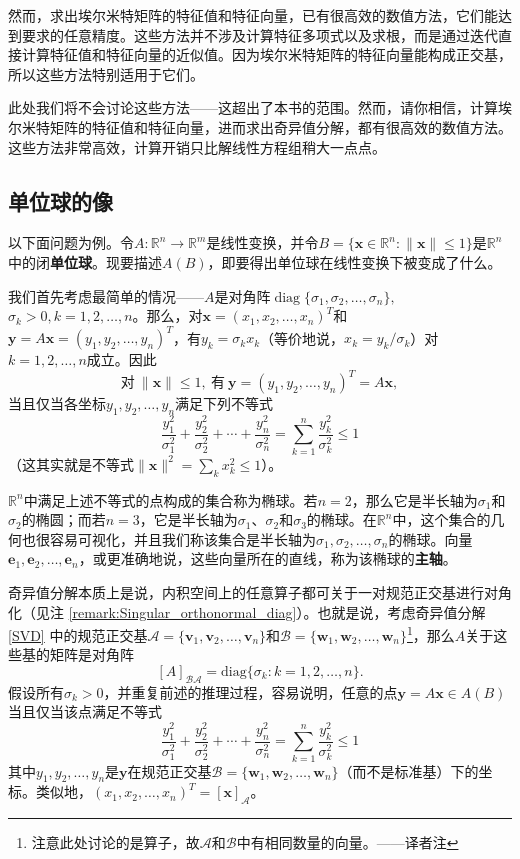 然而，求出埃尔米特矩阵的特征值和特征向量，已有很高效的数值方法，它们能达到要求的任意精度。这些方法并不涉及计算特征多项式以及求根，而是通过迭代直接计算特征值和特征向量的近似值。因为埃尔米特矩阵的特征向量能构成正交基，所以这些方法特别适用于它们。

此处我们将不会讨论这些方法——这超出了本书的范围。然而，请你相信，计算埃尔米特矩阵的特征值和特征向量，进而求出奇异值分解，都有很高效的数值方法。这些方法非常高效，计算开销只比解线性方程组稍大一点点。

\subsection{单位球的像}

以下面问题为例。令$A:\mathbb{R}^n\to \mathbb{R}^m$是线性变换，并令$B=\{\mathbf{x}\in\mathbb{R}^n:\|\mathbf{x}\|\le 1\}$是$\mathbb{R}^n$中的闭{\bf 单位球}。现要描述$A(B)$，即要得出单位球在线性变换下被变成了什么。

我们首先考虑最简单的情况——$A$是对角阵$\operatorname{diag}\{\sigma_1,\sigma_2,\dots,\sigma_n\},$ $\sigma_k>0,k=1,2,\dots,n$。那么，对$\mathbf{x}=(x_{1},x_{2},\ldots,x_{n})^{T}$和$\mathbf{y}=A\mathbf{x}=(y_{1},y_{2},\ldots,y_{n})^{T}$，有$y_k=\sigma_k x_k$（等价地说，$x_k=y_k/\sigma_k$）对$k=1,2,\dots,n$成立。因此
\[\text{对}~\|\mathbf{x}\|\leq1,~\text{有}~\mathbf{y}=(y_1,y_2,\ldots,y_n)^T=A\mathbf{x},\]
当且仅当各坐标$y_1,y_2,\dots,y_n$满足下列不等式
\[\frac{y_1^2}{\sigma_1^2}+\frac{y_2^2}{\sigma_2^2}+\cdots+\frac{y_n^2}{\sigma_n^2}=\sum_{k=1}^n\frac{y_k^2}{\sigma_k^2}\leq1\]
（这其实就是不等式$\|\mathbf{x}\|^2=\sum_k x_k^2\leq1$）。

$\mathbb{R}^n$中满足上述不等式的点构成的集合称为椭球。若$n=2$，那么它是半长轴为$\sigma_1$和$\sigma_2$的椭圆；而若$n=3$，它是半长轴为$\sigma_1$、$\sigma_2$和$\sigma_3$的椭球。在$\mathbb{R}^n$中，这个集合的几何也很容易可视化，并且我们称该集合是半长轴为$\sigma_1,\sigma_2,\dots,\sigma_n$的椭球。向量$\mathbf{e}_{1},\mathbf{e}_{2},\ldots,\mathbf{e}_{n}$，或更准确地说，这些向量所在的直线，称为该椭球的{\bf 主轴}。

奇异值分解本质上是说，内积空间上的任意算子都可关于一对规范正交基进行对角化（见注 \ref{remark:Singular_orthonormal_diag}）。也就是说，考虑奇异值分解 \eqref{SVD} 中的规范正交基$\mathcal{A}=\{\mathbf{v}_{1},\mathbf{v}_{2},\ldots,\mathbf{v}_{n}\}$和$\mathcal{B}=\{\mathbf{w}_{1},\mathbf{w}_{2},\ldots,\mathbf{w}_{n}\}$\footnote{注意此处讨论的是算子，故$\mathcal{A}$和$\mathcal{B}$中有相同数量的向量。——译者注}，那么$A$关于这些基的矩阵是对角阵
\[[A]_{\mathcal{B}\mathcal{A}}=\mathrm{diag}\{\sigma_k:k=1,2,\ldots,n\}.\]
假设所有$\sigma_k>0$，并重复前述的推理过程，容易说明，任意的点$\mathbf{y}=A\mathbf{x}\in A(B)$当且仅当该点满足不等式\[\frac{y_1^2}{\sigma_1^2}+\frac{y_2^2}{\sigma_2^2}+\cdots+\frac{y_n^2}{\sigma_n^2}=\sum_{k=1}^n\frac{y_k^2}{\sigma_k^2}\leq1\]
其中$y_1,y_2,\dots,y_n$是$\mathbf{y}$在规范正交基$\mathcal{B}=\{\mathbf{w}_{1},\mathbf{w}_{2},\ldots,\mathbf{w}_{n}\}$（而不是标准基）下的坐标。类似地，$(x_1,x_2,\ldots,x_n)^T=[\mathbf{x}]_{\mathcal{A}}$。

